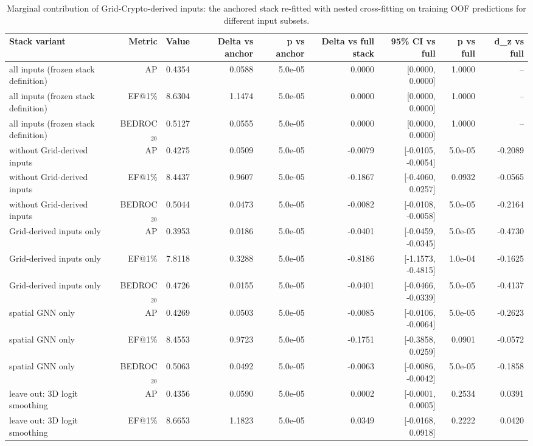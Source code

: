 \begin{table}[t]
\centering
\small
\caption{Marginal contribution of Grid-Crypto-derived inputs: the anchored stack re-fitted with nested cross-fitting on training OOF predictions for different input subsets.}
\label{tab:table4_grid_contribution_oof}
\begin{tabular}{lrrrrrrrr}
\toprule
Stack variant & Metric & Value & Delta vs anchor & p vs anchor & Delta vs full stack & 95\% CI vs full & p vs full & d\_z vs full \\
\midrule
all inputs (frozen stack definition) & AP & 0.4354 & 0.0588 & 5.0e-05 & 0.0000 & [0.0000, 0.0000] & 1.0000 & -- \\
all inputs (frozen stack definition) & EF@1\% & 8.6304 & 1.1474 & 5.0e-05 & 0.0000 & [0.0000, 0.0000] & 1.0000 & -- \\
all inputs (frozen stack definition) & BEDROC$_{20}$ & 0.5127 & 0.0555 & 5.0e-05 & 0.0000 & [0.0000, 0.0000] & 1.0000 & -- \\
without Grid-derived inputs & AP & 0.4275 & 0.0509 & 5.0e-05 & -0.0079 & [-0.0105, -0.0054] & 5.0e-05 & -0.2089 \\
without Grid-derived inputs & EF@1\% & 8.4437 & 0.9607 & 5.0e-05 & -0.1867 & [-0.4060, 0.0257] & 0.0932 & -0.0565 \\
without Grid-derived inputs & BEDROC$_{20}$ & 0.5044 & 0.0473 & 5.0e-05 & -0.0082 & [-0.0108, -0.0058] & 5.0e-05 & -0.2164 \\
Grid-derived inputs only & AP & 0.3953 & 0.0186 & 5.0e-05 & -0.0401 & [-0.0459, -0.0345] & 5.0e-05 & -0.4730 \\
Grid-derived inputs only & EF@1\% & 7.8118 & 0.3288 & 5.0e-05 & -0.8186 & [-1.1573, -0.4815] & 1.0e-04 & -0.1625 \\
Grid-derived inputs only & BEDROC$_{20}$ & 0.4726 & 0.0155 & 5.0e-05 & -0.0401 & [-0.0466, -0.0339] & 5.0e-05 & -0.4137 \\
spatial GNN only & AP & 0.4269 & 0.0503 & 5.0e-05 & -0.0085 & [-0.0106, -0.0064] & 5.0e-05 & -0.2623 \\
spatial GNN only & EF@1\% & 8.4553 & 0.9723 & 5.0e-05 & -0.1751 & [-0.3858, 0.0259] & 0.0901 & -0.0572 \\
spatial GNN only & BEDROC$_{20}$ & 0.5063 & 0.0492 & 5.0e-05 & -0.0063 & [-0.0086, -0.0042] & 5.0e-05 & -0.1858 \\
leave out: 3D logit smoothing & AP & 0.4356 & 0.0590 & 5.0e-05 & 0.0002 & [-0.0001, 0.0005] & 0.2534 & 0.0391 \\
leave out: 3D logit smoothing & EF@1\% & 8.6653 & 1.1823 & 5.0e-05 & 0.0349 & [-0.0168, 0.0918] & 0.2222 & 0.0420 \\

\end{tabular}
\end{table}
